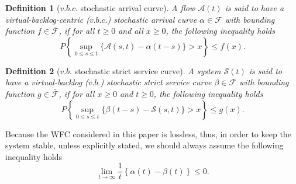 \documentclass[paper]{ieice}
\newtheorem{definition}{Definition}
\begin{document}
\begin{definition}[$v.b.c.$ stochastic arrival curve]
A flow $\mathcal{A}(t)$ is said to have a virtual-backlog-centric ($v.b.c.$) stochastic arrival curve $\alpha\in\mathcal{F}$ with bounding function $f\in\bar{\mathcal{F}}$, if for all $t\geq 0$ and all $x\geq 0$, the following inequality holds
$$P\left\{\sup_{0\leq s\leq t}\{\mathcal{A}(s,t)-\alpha(t-s)\}>x\right\}\leq f(x).$$
\end{definition}

\begin{definition}[$v.b.$ stochastic strict service curve]
A system $\mathcal{S}(t)$ is said to have a virtual-backlog ($v.b.$) stochastic strict service curve $\beta\in\mathcal{F}$ with bounding function $g\in\bar{\mathcal{F}}$, if for all $x\geq 0$ and $t\geq 0$, the following inequality holds
$$P\left\{\sup_{0\leq s\leq t}\{\beta(t-s)-\mathcal{S}(s,t)\}>x\right\}\leq g(x).$$
\end{definition}

Because the WFC considered in this paper is lossless, thus, in order to keep the system stable, unless explicitly stated, we should always assume the following inequality holds
\begin{equation}
  \lim_{t\to \infty}\frac{1}{t}\left\{\alpha(t)-\beta(t)\right\}\leq 0.
\end{equation}
\end{document}
